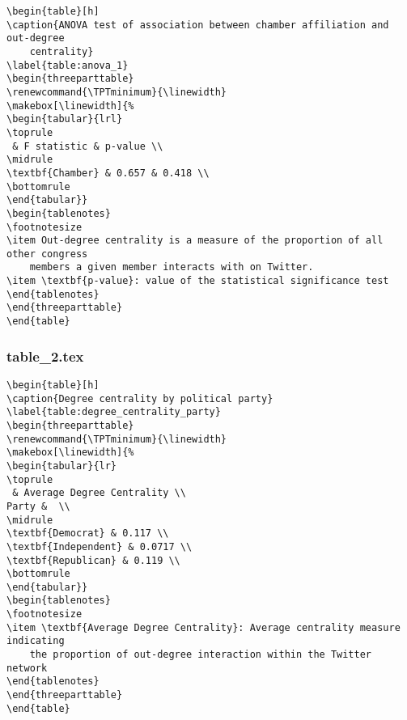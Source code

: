 \documentclass[11pt]{article}
\begin{document}
\begin{Verbatim}[tabsize=4]
\begin{table}[h]
\caption{ANOVA test of association between chamber affiliation and out-degree
	centrality}
\label{table:anova_1}
\begin{threeparttable}
\renewcommand{\TPTminimum}{\linewidth}
\makebox[\linewidth]{%
\begin{tabular}{lrl}
\toprule
 & F statistic & p-value \\
\midrule
\textbf{Chamber} & 0.657 & 0.418 \\
\bottomrule
\end{tabular}}
\begin{tablenotes}
\footnotesize
\item Out-degree centrality is a measure of the proportion of all other congress
	members a given member interacts with on Twitter.
\item \textbf{p-value}: value of the statistical significance test
\end{tablenotes}
\end{threeparttable}
\end{table}

\end{Verbatim}

\subsubsection*{table\_2.tex}

\begin{Verbatim}[tabsize=4]
\begin{table}[h]
\caption{Degree centrality by political party}
\label{table:degree_centrality_party}
\begin{threeparttable}
\renewcommand{\TPTminimum}{\linewidth}
\makebox[\linewidth]{%
\begin{tabular}{lr}
\toprule
 & Average Degree Centrality \\
Party &  \\
\midrule
\textbf{Democrat} & 0.117 \\
\textbf{Independent} & 0.0717 \\
\textbf{Republican} & 0.119 \\
\bottomrule
\end{tabular}}
\begin{tablenotes}
\footnotesize
\item \textbf{Average Degree Centrality}: Average centrality measure indicating
	the proportion of out-degree interaction within the Twitter network
\end{tablenotes}
\end{threeparttable}
\end{table}

\end{Verbatim}
\end{document}

